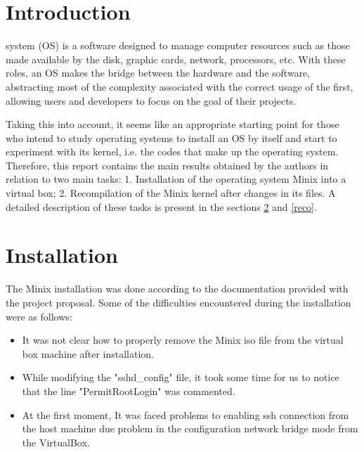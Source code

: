 \section{Introduction}\label{intro}

 system (OS) is a software designed to manage computer resources such as those made available by the disk, graphic cards, network, processors, etc. With these roles, an OS makes the bridge between the hardware and the software, abstracting most of the complexity associated with the correct usage of the first, allowing users and developers to focus on the goal of their projects.  

Taking this into account, it seems like an appropriate starting point for those who intend to study operating systems to install an OS by itself and start to experiment with its kernel, i.e. the codes that make up the operating system. Therefore, this report contains the main results obtained by the authors in relation to two main tasks: 1. Installation of the operating system Minix into a virtual box; 2. Recompilation of the Minix kernel after changes in its files. A detailed description of these tasks is present in the sections \ref{inst} and \ref{reco}.

\section{Installation}\label{inst}
The Minix installation was done according to the documentation provided with the project proposal. Some of the difficulties encountered during the installation were as follows: 
\begin{itemize}
    \item It was not clear how to properly remove the Minix iso file from the virtual box machine after installation.

    \item While modifying the "sshd\_config" file, it took some time for us to notice that the line "PermitRootLogin" was commented.

    \item At the first moment, It was faced problems to enabling ssh connection from the host machine due problem in the configuration network bridge mode from the VirtualBox.

\end{itemize}

